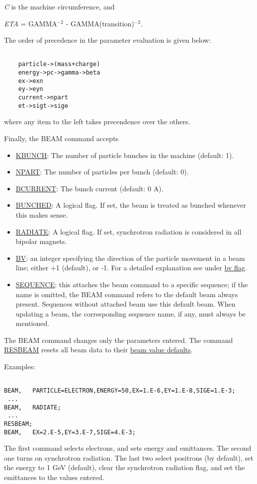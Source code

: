 \textit{C} is the machine circumference, and 

\textit{ETA} = GAMMA$^{-2}$ - GAMMA(transition)$^{-2}$. 

 The order of precedence in the parameter evaluation is given below: 
\begin{verbatim}

    particle->(mass+charge)
    energy->pc->gamma->beta
    ex->exn
    ey->eyn
    current->npart
    et->sigt->sige
\end{verbatim} where any item to the left takes precendence over the others. 

 Finally, the BEAM command accepts 
\begin{itemize}
	\item \href{kbunch}{KBUNCH}: The number of particle bunches in the machine (default: 1). 
	\item \href{npart}{NPART}: The number of particles per bunch (default: 0). 
	\item \href{bcurrent}{BCURRENT}: The bunch current (default: 0 A). 
	\item \href{bunched}{BUNCHED}: A logical flag. If set, the beam is treated as bunched whenever this makes sense. 
	\item \href{radiate}{RADIATE}: A logical flag. If set, synchrotron radiation is considered in all bipolar magnets. 
	\item \href{bv}{BV}: an integer specifying the direction of the particle movement in a beam line; either +1 (default), or -1. For a detailed explanation see under \href{bv_flag.html}{bv flag}. 
	\item \href{sequence}{SEQUENCE}: this attaches the beam command to a specific sequence; if the name is omitted, the BEAM command refers to the default beam always present. Sequences without attached beam use this default beam. When updating a beam, the corresponding sequence name, if any, must always be mentioned. 
\end{itemize} The BEAM command changes only the parameters entered. The command \href{resbeam.html}{RESBEAM} resets all beam data to their  \href{resbeam.html#defaults}{beam value defaults}. 

 Examples: 
\begin{verbatim}

BEAM,   PARTICLE=ELECTRON,ENERGY=50,EX=1.E-6,EY=1.E-8,SIGE=1.E-3;
 ...
BEAM,   RADIATE;
 ...
RESBEAM;
BEAM,   EX=2.E-5,EY=3.E-7,SIGE=4.E-3;
\end{verbatim} The first command selects electrons, and sets energy and emittances. The second one turns on synchrotron radiation. The last two select positrons (by default), set the energy to 1 GeV (default), clear the synchrotron radiation flag, and set the emittances to the values entered. 

